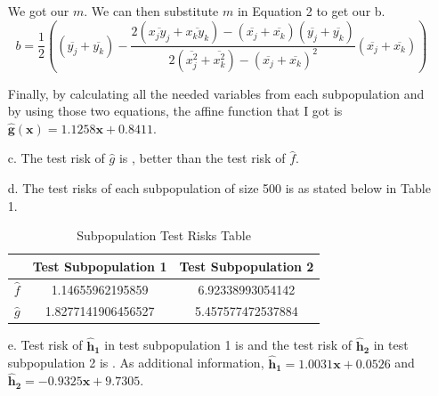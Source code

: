 \documentclass[twoside]{homework}
\begin{document}
\begin{itemize}
    We got our $m$. We can then substitute $m$ in Equation 2 to get our b.
    $$b=\frac{1}{2}((\overline{y_j}+\overline{y_k})-\frac{2(\overline{x_jy_j}+\overline{x_ky_k})-(\overline{x_j}+\overline{x_k})(\overline{y_j}+\overline{y_k})}{2(\overline{x_j^2}+\overline{x_k^2})-(\overline{x_j}+\overline{x_k})^2}(\overline{x_j}+\overline{x_k}))$$

    Finally, by calculating all the needed variables from each subpopulation and by using those two equations, the affine function that I got is $\boldsymbol{\hat{g}(x)= 1.1258x+ 0.8411}$.

    \item[c.] The test risk of $\hat{g}$ is , better than the test risk of $\hat{f}$.

    \item[d.] The test risks of each subpopulation of size 500 is as stated below in Table 1.
        \item[]
            \begin{table}[h!]
                \centering
                \begin{tabular}{||c c c||}
                    \hline
                    $\:$ & Test Subpopulation 1 & Test Subpopulation 2 \\ [0.5ex]
                    \hline\hline
                    $\hat{f}$  & 1.14655962195859 & 6.92338993054142\\
                    \hline
                    $\hat{g}$ & 1.8277141906456527 & 5.457577472537884\\
                    \hline
                \end{tabular}
                \caption{Subpopulation Test Risks Table}
                \label{table:1}
            \end{table}

    \item[e.] Test risk of $\boldsymbol{\hat{h}_1}$ in test subpopulation 1 is  and the test risk of $\boldsymbol{\hat{h}_2}$ in test subpopulation 2 is . As additional information, $\boldsymbol{\hat{h}_1=1.0031x+0.0526}$ and $\boldsymbol{\hat{h}_2=-0.9325x+9.7305}$.
\end{itemize}
\newpage
\end{document}
